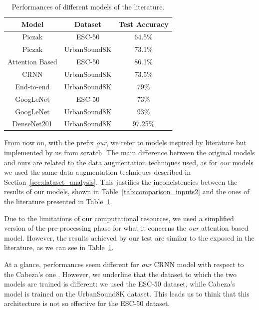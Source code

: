 \documentclass{article}
\begin{document}
\begin{sloppy}
\begin{table}[ht]
  \centering
  \caption{Performances of different models of the literature.}
  \label{tab:comparison_inputs3}
  \begin{tabular}{|c|c|c|}
    \hline
    Model & Dataset & Test Accuracy \\
    \hline
    Piczak \cite{Piczak2015environmental} & ESC-50 & 64.5\% \\
    Piczak \cite{Piczak2015environmental} & UrbanSound8K  & 73.1\% \\
    Attention Based \cite{zhang2019attentionbasedconvolutionalrecurrent} & ESC-50  & 86.1\% \\
    CRNN \cite{crnn_audio_classification} & UrbanSound8K & 73.5\% \\
    End-to-end \cite{end_to_end} & UrbanSound8K  & 79\% \\
    GoogLeNet \cite{google_transfer} & ESC-50  & 73\% \\
    GoogLeNet \cite{google_transfer} & UrbanSound8K  & 93\% \\
    DenseNet201 \cite{electronics11152279} & UrbanSound8K  & 97.25\% \\
    \hline
  \end{tabular}
\end{table}

From now on, with the prefix \textit{our}, we refer to models inspired by literature but implemented by us from scratch.
The main difference between the original models and ours are related to the data augmentation techniques used,
as for \textit{our} models we used the same data augmentation techniques described in Section~\ref{sec:dataset_analysis}.
This justifies the inconcistencies between the results of our models, shown in Table~\ref{tab:comparison_inputs2} and
the ones of the literature presented in Table~\ref{tab:comparison_inputs3}.

Due to the limitations of our computational resources, we used a simplified version of the pre-processing phase
for what it concerns the \textit{our} attention based model. However, the results achieved by our test are similar to
the exposed in the literature, as we can see in Table~\ref{tab:comparison_inputs3}.

At a glance, performances seem different for \textit{our} CRNN model with respect
to the Cabeza's one \cite{crnn_audio_classification}. However, we underline that the dataset
to which the two models are trained is different: we used the ESC-50 dataset, while Cabeza's model is trained on the UrbanSound8K dataset.
This leads us to think that this architecture is not so effective for the ESC-50 dataset.


\end{sloppy}
\end{document}
